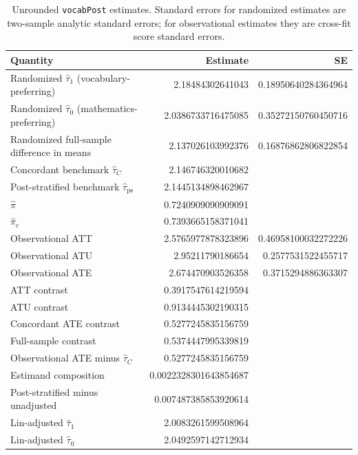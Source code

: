 \documentclass[twoside,11pt]{article}
\begin{document}
\begin{table}[ht]
\centering
\caption{Unrounded \texttt{vocabPost} estimates. Standard errors for randomized estimates are two-sample analytic standard errors; for observational estimates they are cross-fit score standard errors.}
\label{tab:vocab-exact}
\small
\begin{tabular}{lrr}
\toprule
Quantity & Estimate & SE \\
\midrule
Randomized $\widehat\tau_1$ (vocabulary-preferring) & 2.18484302641043 & 0.18950640284364964 \\
Randomized $\widehat\tau_0$ (mathematics-preferring) & 2.0386733716475085 & 0.35272150760450716 \\
Randomized full-sample difference in means & 2.137026103992376 & 0.16876862806822854 \\
Concordant benchmark $\widehat\tau_C$ & 2.146746320010682 & \\
Post-stratified benchmark $\widehat\tau_{\mathrm{ps}}$ & 2.1445134898462967 & \\
$\widehat\pi$ & 0.7240909090909091 & \\
$\widehat\pi_c$ & 0.7393665158371041 & \\
Observational ATT & 2.5765977878323896 & 0.46958100032272226 \\
Observational ATU & 2.95211790186654 & 0.2577531522455717 \\
Observational ATE & 2.674470903526358 & 0.3715294886363307 \\
\midrule
ATT contrast & 0.3917547614219594 & \\
ATU contrast & 0.9134445302190315 & \\
Concordant ATE contrast & 0.5277245835156759 & \\
Full-sample contrast & 0.5374447995339819 & \\
\quad Observational ATE minus $\widehat\tau_C$ & 0.5277245835156759 & \\
\quad Estimand composition & 0.0022328301643854687 & \\
\quad Post-stratified minus unadjusted & 0.007487385853920614 & \\
\midrule
Lin-adjusted $\widehat\tau_1$ & 2.0083261599508964 & \\
Lin-adjusted $\widehat\tau_0$ & 2.0492597142712934 & \\
\bottomrule
\end{tabular}
\end{table}
\end{document}
